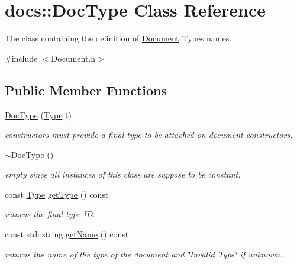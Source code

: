 \hypertarget{classdocs_1_1DocType}{\section{docs\-:\-:Doc\-Type Class Reference}
\label{classdocs_1_1DocType}
}


The class containing the definition of \hyperlink{classdocs_1_1Document}{Document} Types names.  




{\ttfamily \#include $<$Document.\-h$>$}

\subsection*{Public Member Functions}
\begin{DoxyCompactItemize}
\item 
\hypertarget{classdocs_1_1DocType_a0ca0927d1a4d050487d9d14069afc050}{\hyperlink{classdocs_1_1DocType_a0ca0927d1a4d050487d9d14069afc050}{Doc\-Type} (\hyperlink{namespacedocs_a150efca62822b8ab62a5afabe299bf75}{Type} t)}\label{classdocs_1_1DocType_a0ca0927d1a4d050487d9d14069afc050}

\begin{DoxyCompactList}\small\item\em constructors must provide a final type to be attached on document constructors. \end{DoxyCompactList}\item 
\hypertarget{classdocs_1_1DocType_a931f25a0445c46eb7fba5c515124b728}{\hyperlink{classdocs_1_1DocType_a931f25a0445c46eb7fba5c515124b728}{$\sim$\-Doc\-Type} ()}\label{classdocs_1_1DocType_a931f25a0445c46eb7fba5c515124b728}

\begin{DoxyCompactList}\small\item\em empty since all instances of this class are suppose to be constant. \end{DoxyCompactList}\item 
\hypertarget{classdocs_1_1DocType_a1a7221ca7a1b44b1b115c81c469f6f75}{const \hyperlink{namespacedocs_a150efca62822b8ab62a5afabe299bf75}{Type} \hyperlink{classdocs_1_1DocType_a1a7221ca7a1b44b1b115c81c469f6f75}{get\-Type} () const }\label{classdocs_1_1DocType_a1a7221ca7a1b44b1b115c81c469f6f75}

\begin{DoxyCompactList}\small\item\em returns the final type I\-D. \end{DoxyCompactList}\item 
\hypertarget{classdocs_1_1DocType_a4632fc57ed71ebb984aa8dd78017db03}{const std\-::string \hyperlink{classdocs_1_1DocType_a4632fc57ed71ebb984aa8dd78017db03}{get\-Name} () const }\label{classdocs_1_1DocType_a4632fc57ed71ebb984aa8dd78017db03}

\begin{DoxyCompactList}\small\item\em returns the name of the type of the document and \char`\"{}\-Invalid Type\char`\"{} if unknown. \end{DoxyCompactList}\end{DoxyCompactItemize}
